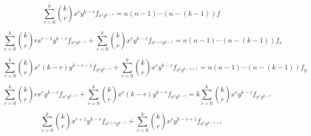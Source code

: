 \documentclass[11pt,a4paper]{article}
\begin{document}
\[ \sum_{r=0}^k \binom{k}{r} x^r y^{k-r} f_{x^r y^{k-r}} = n(n-1)\dotsm(n-(k-1))f \]

\[ \sum_{r=0}^k \binom{k}{r} r x^{r-1} y^{k-r} f_{x^r y^{k-r}} + \sum_{r=0}^k \binom{k}{r}  x^{r} y^{k-r} f_{x^{r+1} y^{k-r}} = n(n-1)\dotsm(n-(k-1))f_x \]

\[ \sum_{r=0}^k \binom{k}{r} x^r (k-r)y^{k-r-1} f_{x^r y^{k-r}} + \sum_{r=0}^k \binom{k}{r} x^r y^{k-r} f_{x^r y^{k-r+1}} = n(n-1)\dotsm(n-(k-1))f_y \]

\[\sum_{r=0}^k \binom{k}{r} r x^{r} y^{k-r} f_{x^r y^{k-r}} + \sum_{r=0}^k \binom{k}{r} x^r (k-r)y^{k-r} f_{x^r y^{k-r}} = k \sum_{r=0}^k \binom{k}{r} x^r y^{k-r} f_{x^r y^{k-r}}\] 

\[ \sum_{r=0}^k \binom{k}{r}  x^{r+1} y^{k-r} f_{x^{r+1} y^{k-r}} + \sum_{r=0}^k \binom{k}{r} x^r y^{k-r+1} f_{x^r y^{k-r+1}}\]
\end{document}
